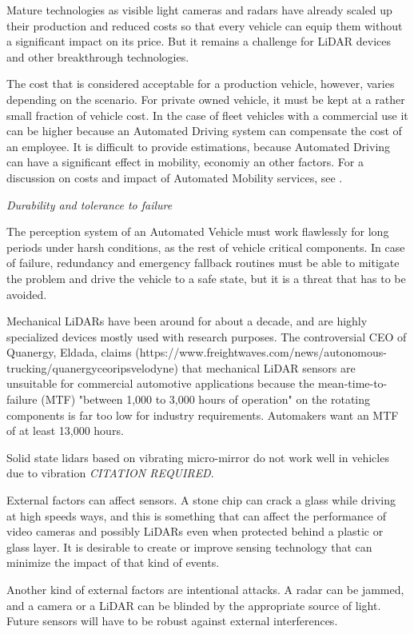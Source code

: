 Mature technologies as visible light cameras and radars have already scaled up 
their production and reduced costs so that every vehicle can equip them without
a significant impact on its price. But it remains a challenge for LiDAR devices
and other breakthrough technologies.

The cost that is considered acceptable for a production vehicle, however, 
varies depending on the scenario. For private owned vehicle, it must be kept at
a rather small fraction of vehicle cost. In the case of fleet vehicles with a 
commercial use it can be higher because an Automated Driving system can 
compensate the cost of an employee.
It is difficult to provide estimations, because Automated Driving can have a 
significant effect in mobility, economiy an other factors. For a discussion
on costs and impact of Automated Mobility services, see \cite{Bosch2018}.

\emph{Durability and tolerance to failure}

The perception system of an Automated Vehicle must work flawlessly for long
periods under harsh conditions, as the rest of vehicle critical components. 
In case of failure, redundancy and emergency fallback routines must be able to 
mitigate the problem and drive the vehicle to a safe state, but it is a 
threat that has to be avoided.

Mechanical LiDARs have been around for about a decade, and are highly 
specialized devices mostly used with research purposes.
The controversial CEO of Quanergy, Eldada, claims 
(https://www.freightwaves.com/news/autonomous-trucking/quanergyceoripsvelodyne)
that mechanical LiDAR sensors are unsuitable for commercial 
automotive applications because the mean-time-to-failure (MTF)
"between 1,000 to 3,000 hours of operation" on the rotating 
components is far too low for industry requirements. Automakers want an MTF
of at least 13,000 hours.

Solid state lidars based on vibrating micro-mirror do not work well in
vehicles due to vibration \emph{CITATION REQUIRED}.

External factors can affect sensors. A stone chip can crack a glass while 
driving at high speeds ways, and this is something that can affect the 
performance of video cameras and possibly LiDARs even when protected behind
a plastic or glass layer. It is desirable to create or improve sensing 
technology that can minimize the impact of that kind of events.

Another kind of external factors are intentional attacks. A radar can be jammed,
and a camera or a LiDAR can be blinded by the appropriate source of light.
Future sensors will have to be robust against external interferences.


